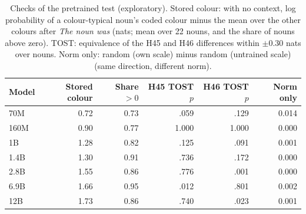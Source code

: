 \begin{table}[!htbp]
\centering\small

\begin{tabular}{@{}lrrrrr@{}}
\toprule
Model & Stored colour & Share $>0$ & H45 TOST $p$ & H46 TOST $p$ & Norm only \\
\midrule
70M & 0.72 & 0.73 & .059 & .129 & 0.014 \\
160M & 0.90 & 0.77 & 1.000 & 1.000 & 0.000 \\
1B & 1.28 & 0.82 & .125 & .091 & 0.001 \\
1.4B & 1.30 & 0.91 & .736 & .172 & 0.000 \\
2.8B & 1.55 & 0.86 & .776 & .001 & 0.000 \\
6.9B & 1.66 & 0.95 & .012 & .801 & \textminus{}0.002 \\
12B & 1.73 & 0.86 & .740 & .023 & \textminus{}0.001 \\
\bottomrule
\end{tabular}
\caption{Checks of the pretrained test (exploratory). Stored colour: with no context, log probability of a colour-typical noun's coded colour minus the mean over the other colours after \emph{The \textit{noun} was} (nats; mean over 22 nouns, and the share of nouns above zero). TOST: equivalence of the H45 and H46 differences within $\pm$0.30 nats over nouns. Norm only: random (own scale) minus random (untrained scale) (same direction, different norm).}
\label{tab:N12}
\end{table}


